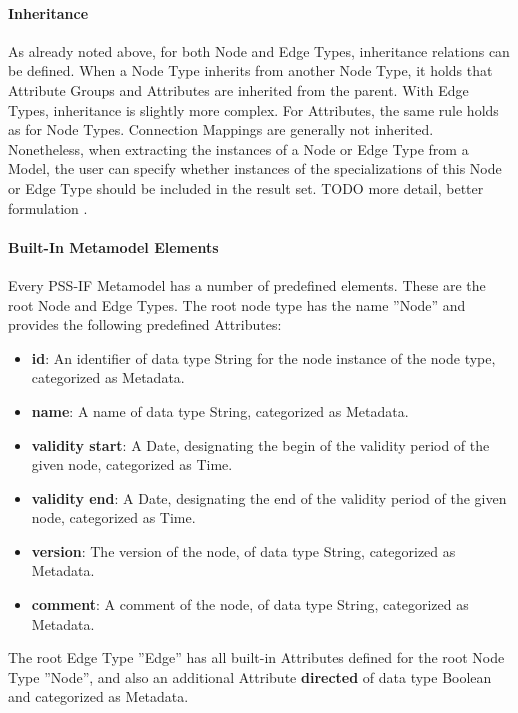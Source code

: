 \paragraph{Inheritance}

As already noted above, for both Node and Edge Types, inheritance relations can be defined. When a Node Type inherits from another Node Type, it holds that Attribute Groups and Attributes are inherited from the parent. With Edge Types, inheritance is slightly more complex. For Attributes, the same rule holds as for Node Types. Connection Mappings are generally not inherited. Nonetheless, when extracting the instances of a Node or Edge Type from a Model, the user can specify whether instances of the specializations of this Node or Edge Type should be included in the result set. \color{red}TODO more detail, better formulation \color{black}.

\paragraph{Built-In Metamodel Elements}

Every PSS-IF Metamodel has a number of predefined elements. These are the root Node and Edge Types. The root node type has the name ''Node'' and provides the following predefined Attributes:

\begin{itemize}
\item \textbf{id}: An identifier of data type String for the node instance of the node type, categorized as Metadata.
\item \textbf{name}: A name of data type String, categorized as Metadata.
\item \textbf{validity start}: A Date, designating the begin of the validity period of the given node, categorized as Time.
\item \textbf{validity end}: A Date, designating the end of the validity period of the given node, categorized as Time.
\item \textbf{version}: The version of the node, of data type String, categorized as Metadata.
\item \textbf{comment}: A comment of the node, of data type String, categorized as Metadata.
\end{itemize}

The root Edge Type ''Edge'' has all built-in Attributes defined for the root Node Type ''Node'', and also an additional Attribute \textbf{directed} of data type Boolean and categorized as Metadata. 


